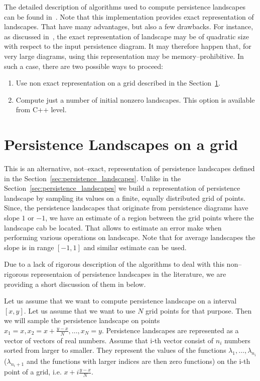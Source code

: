 \documentclass[11pt]{article}
\begin{document}
The detailed description of algorithms used to compute persistence landscapes can be found in~\cite{landscapes2}. Note that this implementation provides exact representation of landscapes. That have many advantages, but also a few drawbacks. For instance, as discussed in~\cite{landscapes2}, the exact representation of landscape may be of quadratic size with respect to the input persistence diagram. It may therefore happen that, for very large diagrams, using this representation may be memory--prohibitive. In such a case, there are two possible ways to proceed:
\begin{enumerate}
\item Use non exact representation on a grid described in the Section~\ref{sec:landscapes_on_grid}.
\item Compute just a number of initial nonzero landscapes. This option is available from C++ level. 
\end{enumerate}



\section{Persistence Landscapes on a grid}
\label{sec:landscapes_on_grid}
This is an alternative, not--exact, representation of persistence landscapes defined in the Section~\ref{sec:persistence_landscapes}. Unlike in the Section~\ref{sec:persistence_landscapes} we build a representation of persistence landscape by sampling its values on a finite, equally distributed grid of points. Since, the persistence landscapes that originate from persistence diagrams have slope $1$ or $-1$, we have an estimate of a region between the grid points where the landscape cab be located. That allows to estimate an error make when performing various operations on landscape. Note that for average landscapes the slope is in range $[-1,1]$ and similar estimate can be used. 

Due to a lack of rigorous description of the algorithms to deal with this non--rigorous representaion of persistence landscapes in the literature, we are providing a short discussion of them in below.

Let us assume that we want to compute persistence landscape on a interval $[x,y]$. Let us assume that we want to use $N$ grid points for that purpose. Then we will sample the persistence landscape on points $x_1 = x , x_2 = x + \frac{y-x}{N}, \ldots , x_{N} = y$. Persistence landscapes are represented as a vector of vectors of real numbers. Assume that i-th vector consist of $n_i$ numbers sorted from larger to smaller. They represent the values of the functions $\lambda_1,\ldots,\lambda_{n_i}$ ($\lambda_{n_i+1}$ and the functions with larger indices are then zero functions) on the i-th point of a grid, i.e. $x + i \frac{y-x}{N}$. 
\end{document}
